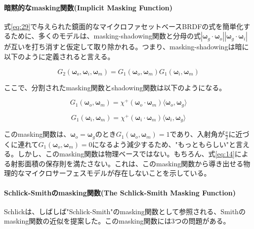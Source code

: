 \documentclass[a4j,xelatex,ja=standard]{bxjsarticle}
\begin{document}
\paragraph{暗黙的なmasking関数(Implicit Masking Function)}

式\eqref{eq:29}で与えられた鏡面的なマイクロファセットベースBRDFの式を簡単化するために、多くのモデルは、masking-shadowing関数と分母の式$|\boldsymbol{\omega}_g \cdot \boldsymbol{\omega}_o| |\boldsymbol{\omega}_g \cdot \boldsymbol{\omega}_i|$が互いを打ち消すと仮定して取り除かれる。つまり、masking-shadowingは暗に以下のように定義されると言える。

\begin{equation}
    G_2(\boldsymbol{\omega}_o, \boldsymbol{\omega}_i, \boldsymbol{\omega}_m) = G_1(\boldsymbol{\omega}_o, \boldsymbol{\omega}_m) G_1(\boldsymbol{\omega}_i, \boldsymbol{\omega}_m)
    \label{eq:55}
\end{equation}

ここで、分割されたmasking関数とshadowing関数は以下のようになる。

\begin{equation}
    G_1(\boldsymbol{\omega}_o, \boldsymbol{\omega}_m) = \chi^+(\boldsymbol{\omega}_o \cdot \boldsymbol{\omega}_m) \langle \boldsymbol{\omega}_o, \boldsymbol{\omega}_g \rangle
    \label{eq:56}
\end{equation}

\begin{equation}
    G_1(\boldsymbol{\omega}_i, \boldsymbol{\omega}_m) = \chi^+(\boldsymbol{\omega}_i \cdot \boldsymbol{\omega}_m) \langle \boldsymbol{\omega}_i, \boldsymbol{\omega}_g \rangle
    \label{eq:57}
\end{equation}

このmasking関数は、$\boldsymbol{\omega}_o = \boldsymbol{\omega}_g$のとき$G_1(\boldsymbol{\omega}_o, \boldsymbol{\omega}_m) = 1$であり、入射角が$\frac{\pi}{2}$に近づくに連れて$G_1(\boldsymbol{\omega}_o, \boldsymbol{\omega}_m) = 0$になるよう減少するため、"もっともらしい"と言える。しかし、このmasking関数は物理ベースではない。もちろん、式\eqref{eq:14}による射影面積の保存則を満たさない。これは、このmasking関数から導き出せる物理的なマイクロサーフェスモデルが存在しないことを示している。

\paragraph{Schlick-Smithのmasking関数(The Schlick-Smith Masking Function)}

Schlickは、しばしば"Schlick-Smith"のmasking関数として参照される、Smithのmasking関数の近似を提案した。このmasking関数には3つの問題がある。
\end{document}
